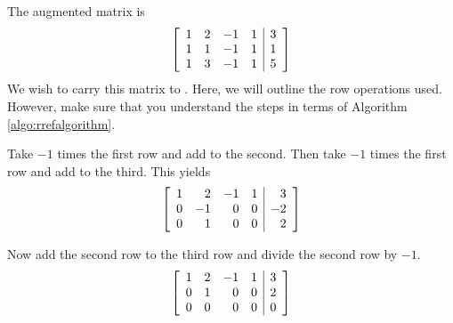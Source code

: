 \begin{solution} The augmented matrix is
\begin{equation*}
\left[
\begin{array}{rrrr|r}
1 & 2 & -1 & 1 & 3 \\
1 & 1 & -1 & 1 & 1 \\
1 & 3 & -1 & 1 & 5
\end{array}
\right] 
\end{equation*}
We wish to carry this matrix to \ef. Here, we will outline the row operations used. However, make sure that you 
understand the steps in terms of Algorithm \ref{algo:rrefalgorithm}.

Take $-1$ times the first row and add to the second. Then take $-1$ times
the first row and add to the third. This yields
\begin{equation*}
\left[
\begin{array}{rrrr|r}
1 & 2 & -1 & 1 & 3 \\
0 & -1 & 0 & 0 & -2 \\
0 & 1 & 0 & 0 & 2
\end{array}
\right]
\end{equation*}

Now add the second row to the third row and divide the second row by $-1$.
\begin{equation}
\left[
\begin{array}{rrrr|r}
1 & 2 & -1 & 1 & 3 \\
0 & 1 & 0 & 0 & 2 \\
0 & 0 & 0 & 0 & 0
\end{array}
\right]  \label{twoparameters1}
\end{equation}



\end{solution}
